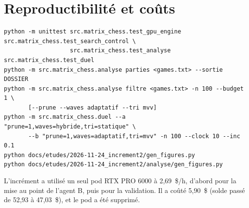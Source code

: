 \documentclass[11pt,a4paper]{article}
\begin{document}
\section{Reproductibilité et coûts}
{\footnotesize
\begin{verbatim}
python -m unittest src.matrix_chess.test_gpu_engine src.matrix_chess.test_search_control \
                   src.matrix_chess.test_analyse src.matrix_chess.test_duel
python -m src.matrix_chess.analyse parties <games.txt> --sortie DOSSIER
python -m src.matrix_chess.analyse filtre <games.txt> -n 100 --budget 1 \
       [--prune --waves adaptatif --tri mvv]
python -m src.matrix_chess.duel --a "prune=1,waves=hybride,tri=statique" \
       --b "prune=1,waves=adaptatif,tri=mvv" -n 100 --clock 10 --inc 0.1
python docs/etudes/2026-11-24_increment2/gen_figures.py
python docs/etudes/2026-11-24_increment2/analyse/gen_figures.py
\end{verbatim}}

L'incrément a utilisé un seul pod RTX PRO 6000 à 2{,}69~\$/h, d'abord pour la mise au point de
l'agent B, puis pour la validation. Il a coûté 5{,}90~\$ (solde passé de 52{,}93 à 47{,}03~\$), et
le pod a été supprimé.
\end{document}
